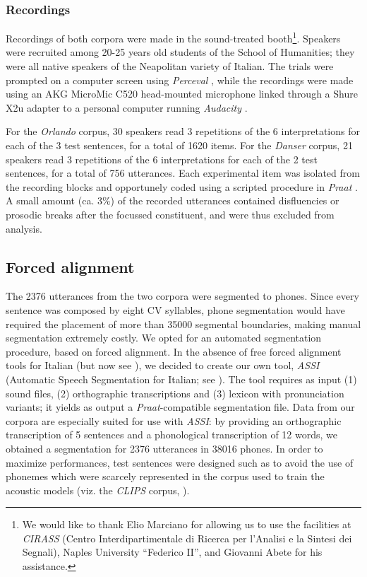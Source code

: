 \subsubsection{Recordings}\label{sec4213}
Recordings of both corpora were made in the sound-treated booth\footnote{We would like to thank Elio Marciano for allowing us to use the facilities at \textit{CIRASS} (Centro Interdipartimentale di Ricerca per l'Analisi e la Sintesi dei Segnali), Naples University ``Federico II'', and Giovanni Abete for his assistance.}. Speakers were recruited among 20-25 years old students of the School of Humanities; they were all native speakers of the Neapolitan variety of Italian. The trials were prompted on a computer screen using \textit{Perceval} \citep{andre2003perceval}, while the recordings were made using an AKG MicroMic C520 head-mounted microphone linked through a Shure X2u adapter to a personal computer running \textit{Audacity} \citep{audacity2006audacity}. 

For the \textit{Orlando} corpus, 30 speakers read 3 repetitions of the 6 interpretations for each of the 3 test sentences, for a total of 1620 items. For the \textit{Danser} corpus, 21 speakers read 3 repetitions of the 6 interpretations for each of the 2 test sentences, for a total of 756 utterances. Each experimental item was isolated from the recording blocks and opportunely coded using a scripted procedure in \textit{Praat} \citep{boersma2008praat}. A small amount (ca. 3\%) of the recorded utterances contained disfluencies or prosodic breaks after the focussed constituent, and were thus excluded from analysis. 

\subsection{Forced alignment}\label{sec422}
The 2376 utterances from the two corpora were segmented to phones. Since every sentence was composed by eight CV syllables, phone segmentation would have required the placement of more than 35000 segmental boundaries, making manual segmentation extremely costly. We opted for an automated segmentation procedure, based on forced alignment. In the absence of free forced alignment tools for Italian (but now see \citealt{bigi2012speech}), we decided to create our own tool, \textit{ASSI} (Automatic Speech Segmentation for Italian; see \citealt{cangemi2011automatic}). The tool requires as input (1) sound files, (2) orthographic transcriptions and (3) lexicon with pronunciation variants; it yields as output a \textit{Praat}-compatible segmentation file. Data from our corpora are especially suited for use with \textit{ASSI}: by providing an orthographic transcription of 5 sentences and a phonological transcription of 12 words, we obtained a segmentation for 2376 utterances in 38016 phones. In order to maximize performances, test sentences were designed such as to avoid the use of phonemes which were scarcely represented in the corpus used to train the acoustic models (viz. the \textit{CLIPS} corpus, \citealt{savy2009clips}). 


